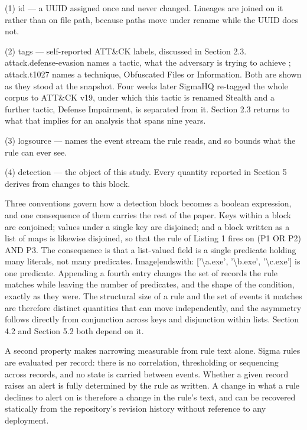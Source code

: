 (1)  id --- a UUID assigned once and never changed. Lineages are joined on it rather than on file path, because paths move under rename while the UUID does not.

(2)  tags --- self-reported ATT\&CK labels, discussed in Section 2.3. attack.defense-evasion names a tactic, what the adversary is trying to achieve \citep{strom2020}; attack.t1027 names a technique, Obfuscated Files or Information. Both are shown as they stood at the snapshot. Four weeks later SigmaHQ re-tagged the whole corpus to ATT\&CK v19, under which this tactic is renamed Stealth and a further tactic, Defense Impairment, is separated from it. Section 2.3 returns to what that implies for an analysis that spans nine years.

(3)  logsource --- names the event stream the rule reads, and so bounds what the rule can ever see.

(4)  detection --- the object of this study. Every quantity reported in Section 5 derives from changes to this block.

Three conventions govern how a detection block becomes a boolean expression, and one consequence of them carries the rest of the paper. Keys within a block are conjoined; values under a single key are disjoined; and a block written as a list of maps is likewise disjoined, so that the rule of Listing 1 fires on (P1 OR P2) AND P3. The consequence is that a list-valued field is a single predicate holding many literals, not many predicates. Image|endswith: ['\textbackslash{}a.exe', '\textbackslash{}b.exe', '\textbackslash{}c.exe'] is one predicate. Appending a fourth entry changes the set of records the rule matches while leaving the number of predicates, and the shape of the condition, exactly as they were. The structural size of a rule and the set of events it matches are therefore distinct quantities that can move independently, and the asymmetry follows directly from conjunction across keys and disjunction within lists. Section 4.2 and Section 5.2 both depend on it.

A second property makes narrowing measurable from rule text alone. Sigma rules are evaluated per record: there is no correlation, thresholding or sequencing across records, and no state is carried between events. Whether a given record raises an alert is fully determined by the rule as written. A change in what a rule declines to alert on is therefore a change in the rule's text, and can be recovered statically from the repository's revision history without reference to any deployment.

